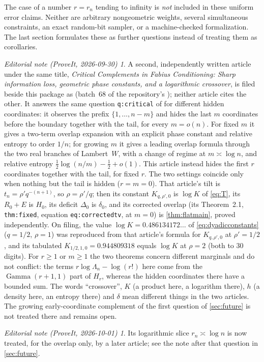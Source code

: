 \documentclass[11pt,oneside]{article}
\numberwithin{equation}{section}
\theoremstyle{plain}
\theoremstyle{definition}
\theoremstyle{remark}
\newtheorem*{ednote}{Editorial note (ProveIt, 2026-09-30)}
\newtheorem*{ednotelater}{Editorial note (ProveIt, 2026-10-01)}
\newcommand{\Gam}{\operatorname{Gamma}}
\begin{document}
The case of a number $r=r_n$ tending to infinity is \emph{not} included in
these uniform error claims. Neither are arbitrary nongeometric weights,
several simultaneous constraints, an exact random-bit sampler, or a
machine-checked formalization. The last section formulates these as
further questions instead of treating them as corollaries.
\begin{ednote}
A second, independently written article under the same title,
\emph{Critical Complements in Fabius Conditioning: Sharp information loss,
geometric phase constants, and a logarithmic crossover}, is filed beside
this package as 
(batch~68 of the repository's ); neither article cites
the other. It answers the same question \texttt{q:critical} of
\cite{repoSharp} for different hidden coordinates: it observes the prefix
$\{1,\ldots,n-m\}$ and hides the last $m$ coordinates before the boundary
together with the tail, for every $m=o(n)$. For fixed $m$ it gives a
two-term overlap expansion with an explicit phase constant and relative
entropy to order $1/n$; for growing
$m$ it gives a leading overlap formula through the two real branches of
Lambert~$W$, with a change of regime at $m\asymp\log n$, and relative
entropy $\frac12\log(n/m)-\frac12+o(1)$. This article instead hides the
first $r$ coordinates together with the tail, for fixed $r$.
The two settings coincide only when nothing but the tail is hidden
($r=m=0$). That article's tilt is $t_n=\rho'q^{-(n+1)}$, so $\rho=\rho'/q$;
then its constant $K_{q,\rho',0}$ is $\log K$ of \eqref{eq:T}, its $R_0+E$
is $H_0$, its deficit $\Delta_0$ is $\delta_0$, and its corrected overlap
(its Theorem~2.1, \texttt{thm:fixed}, equation \texttt{eq:correctedtv}, at
$m=0$) is \cref{thm:flatmain}, proved independently. On filing, the value
$\log K=0.486134172\ldots$ of \eqref{eq:dyadicconstants} ($q=1/2$, $\rho=1$)
was reproduced from that article's formula for $K_{q,\rho',0}$ at
$\rho'=1/2$, and its tabulated $K_{1/2,1,0}=0.944809318$ equals $\log K$ at
$\rho=2$ (both to 30 digits). For $r\ge1$ or $m\ge1$ the two theorems
concern different marginals and do not conflict: the terms
$r\log\Lambda_n-\log(r!)$ here come from the $\Gam(r+1,1)$ part of $H_r$,
whereas the hidden coordinates there have a bounded sum. The words
``crossover'', $K$ (a product here, a logarithm there), $h$ (a density
here, an entropy there) and $\delta$ mean different things in the two
articles. The growing early-coordinate complement of the first question
of \cref{sec:future} is not treated there and remains open.
\end{ednote}
\begin{ednotelater}
Its logarithmic slice $r_n\asymp\log n$ is now treated, for the overlap
only, by a later article; see the note after that question in
\cref{sec:future}.
\end{ednotelater}
\end{document}

